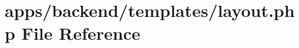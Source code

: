 \hypertarget{backend_2templates_2layout_8php}{\section{apps/backend/templates/layout.php File Reference}
\label{backend_2templates_2layout_8php}
}
